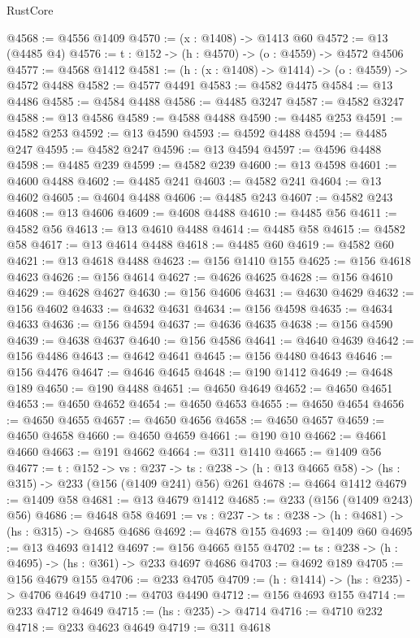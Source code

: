 \begin{lexlean}{RustCore}
\begin{coremodule}
@4568 := @4556 @1409
@4570 := (x : @1408) -> @1413 @60
@4572 := @13 (@4485 @4)
@4576 := {t : @152} -> (h : @4570) -> (o : @4559) -> @4572 @4506
@4577 := @4568 @1412
@4581 := (h : (x : @1408) -> @1414) -> (o : @4559) -> @4572 @4488
@4582 := @4577 @4491
@4583 := @4582 @4475
@4584 := @13 @4486
@4585 := @4584 @4488
@4586 := @4485 @3247
@4587 := @4582 @3247
@4588 := @13 @4586
@4589 := @4588 @4488
@4590 := @4485 @253
@4591 := @4582 @253
@4592 := @13 @4590
@4593 := @4592 @4488
@4594 := @4485 @247
@4595 := @4582 @247
@4596 := @13 @4594
@4597 := @4596 @4488
@4598 := @4485 @239
@4599 := @4582 @239
@4600 := @13 @4598
@4601 := @4600 @4488
@4602 := @4485 @241
@4603 := @4582 @241
@4604 := @13 @4602
@4605 := @4604 @4488
@4606 := @4485 @243
@4607 := @4582 @243
@4608 := @13 @4606
@4609 := @4608 @4488
@4610 := @4485 @56
@4611 := @4582 @56
@4613 := @13 @4610 @4488
@4614 := @4485 @58
@4615 := @4582 @58
@4617 := @13 @4614 @4488
@4618 := @4485 @60
@4619 := @4582 @60
@4621 := @13 @4618 @4488
@4623 := @156 @1410 @155
@4625 := @156 @4618 @4623
@4626 := @156 @4614
@4627 := @4626 @4625
@4628 := @156 @4610
@4629 := @4628 @4627
@4630 := @156 @4606
@4631 := @4630 @4629
@4632 := @156 @4602
@4633 := @4632 @4631
@4634 := @156 @4598
@4635 := @4634 @4633
@4636 := @156 @4594
@4637 := @4636 @4635
@4638 := @156 @4590
@4639 := @4638 @4637
@4640 := @156 @4586
@4641 := @4640 @4639
@4642 := @156 @4486
@4643 := @4642 @4641
@4645 := @156 @4480 @4643
@4646 := @156 @4476
@4647 := @4646 @4645
@4648 := @190 @1412
@4649 := @4648 @189
@4650 := @190 @4488
@4651 := @4650 @4649
@4652 := @4650 @4651
@4653 := @4650 @4652
@4654 := @4650 @4653
@4655 := @4650 @4654
@4656 := @4650 @4655
@4657 := @4650 @4656
@4658 := @4650 @4657
@4659 := @4650 @4658
@4660 := @4650 @4659
@4661 := @190 @10
@4662 := @4661 @4660
@4663 := @191 @4662
@4664 := @311 @1410
@4665 := @1409 @56
@4677 := {t : @152} ->
  {vs : @237} ->
  {ts : @238} -> (h : @13 @4665 @58) -> (hs : @315) -> @233 (@156 (@1409 @241) @56) @261
@4678 := @4664 @1412
@4679 := @1409 @58
@4681 := @13 @4679 @1412
@4685 := @233 (@156 (@1409 @243) @56)
@4686 := @4648 @58
@4691 := {vs : @237} -> {ts : @238} -> (h : @4681) -> (hs : @315) -> @4685 @4686
@4692 := @4678 @155
@4693 := @1409 @60
@4695 := @13 @4693 @1412
@4697 := @156 @4665 @155
@4702 := {ts : @238} -> (h : @4695) -> (hs : @361) -> @233 @4697 @4686
@4703 := @4692 @189
@4705 := @156 @4679 @155
@4706 := @233 @4705
@4709 := (h : @1414) -> (hs : @235) -> @4706 @4649
@4710 := @4703 @4490
@4712 := @156 @4693 @155
@4714 := @233 @4712 @4649
@4715 := (hs : @235) -> @4714
@4716 := @4710 @232
@4718 := @233 @4623 @4649
@4719 := @311 @4618

\end{coremodule}
\end{lexlean}
